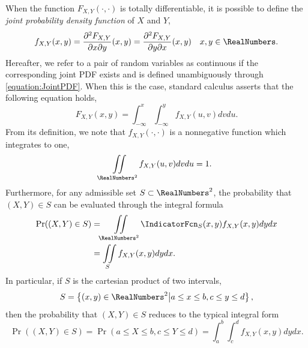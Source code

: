When the function $F_{X,Y} (\cdot, \cdot)$ is totally differentiable, it is possible to define the \emph{joint probability density function} of $X$ and $Y$, 
\begin{equation} \label{equation:JointPDF}
f_{X,Y} (x,y) = \frac{\partial^2 F_{X,Y}}{\partial x \partial y} (x,y)
= \frac{\partial^2 F_{X,Y}}{\partial y \partial x} (x,y) \quad x,y \in  \RealNumbers .
\end{equation}
Hereafter, we refer to a pair of random variables as continuous if the corresponding joint PDF exists and is defined unambiguously through \eqref{equation:JointPDF}.
When this is the case, standard calculus asserts that the following equation holds,
\begin{equation*}
F_{X,Y} (x,y) = \int_{-\infty}^x \int_{-\infty}^y f_{X,Y} (u,v) dv du .
\end{equation*}
From its definition, we note that $f_{X,Y} (\cdot, \cdot)$ is a nonnegative function which integrates to one,
\begin{equation*}
\iint\limits_{\RealNumbers^2}
f_{X, Y} (u, v) dv du = 1.
\end{equation*}
Furthermore, for any admissible set $S \subset \RealNumbers^2$, the probability that $(X,Y) \in S$ can be evaluated through the integral formula
\begin{equation} \label{equation:ProbabilityJointPDF}
\begin{split}
\Pr ((X,Y) \in S)
&= \iint\limits_{\RealNumbers^2}
\IndicatorFcn_{S} (x, y) f_{X, Y} (x, y) dy dx \\
&= \iint\limits_{S}
f_{X, Y} (x, y) dy dx .
\end{split}
\end{equation}
In particular, if $S$ is the cartesian product of two intervals, 
\begin{equation*}
S = \left\{ (x,y) \in \RealNumbers^2 \big| a \leq x \leq b, c \leq y \leq d \right\} ,
\end{equation*}
then the probability that $(X,Y) \in S$ reduces to the typical integral form
\begin{equation*}
\Pr ((X,Y) \in S)
= \Pr (a \leq X \leq b, c \leq Y \leq d)
= \int_{a}^{b} \int_{c}^{d}
f_{X, Y} (x, y) dy dx .
\end{equation*}

